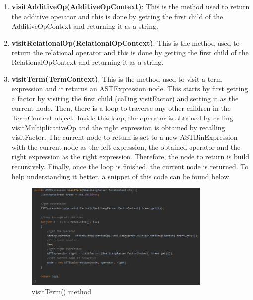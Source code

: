 \documentclass{article}
\begin{document}
\begin{enumerate}
					\item \textbf{visitAdditiveOp(AdditiveOpContext)}: This is the method used to return the additive operator and this is done by getting the first child of the AdditiveOpContext and returning it as a string.
					
					\item \textbf{visitRelationalOp(RelationalOpContext)}: This is the method used to return the relational operator and this is done by getting the first child of the RelationalOpContext and returning it as a string.
					
					\item \textbf{visitTerm(TermContext)}:  This is the method used to visit a term expression and it returns an ASTExpression node. This starts by first getting a factor by visiting the first child (calling visitFactor) and setting it as the current node. Then, there is a loop to traverse any other children in the TermContext object. Inside this loop, the operator is obtained by calling visitMultiplicativeOp and the right expression is obtained by recalling visitFactor. The current node to return is set to a new ASTBinExpression with the current node as the left expression, the obtained operator and the right expression as the right expression. Therefore, the node to return is build recursively. Finally, once the loop is finished, the current node is returned. To help understanding it better, a snippet of this code can be found below.
					
										\begin{figure}[H]
					\centering
			 			\includegraphics[width=0.85\textwidth]{transformerterm.png}
			  			\caption{visitTerm() method}
			  			\label{fig:transformerterm}
					\end{figure}
					

\end{enumerate}
\end{document}
